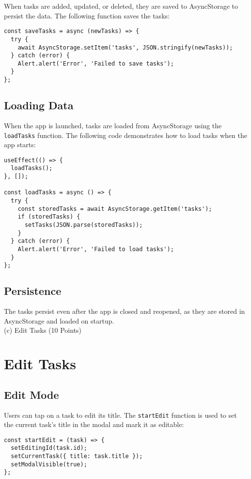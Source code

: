 \documentclass{article}
\begin{document}
When tasks are added, updated, or deleted, they are saved to AsyncStorage to persist the data. The following function saves the tasks:

\begin{verbatim}
const saveTasks = async (newTasks) => {
  try {
    await AsyncStorage.setItem('tasks', JSON.stringify(newTasks));
  } catch (error) {
    Alert.alert('Error', 'Failed to save tasks');
  }
};
\end{verbatim}

\subsection*{Loading Data}

When the app is launched, tasks are loaded from AsyncStorage using the \texttt{loadTasks} function. The following code demonstrates how to load tasks when the app starts:

\begin{verbatim}
useEffect(() => {
  loadTasks();
}, []);

const loadTasks = async () => {
  try {
    const storedTasks = await AsyncStorage.getItem('tasks');
    if (storedTasks) {
      setTasks(JSON.parse(storedTasks));
    }
  } catch (error) {
    Alert.alert('Error', 'Failed to load tasks');
  }
};
\end{verbatim}

\subsection*{Persistence}

The tasks persist even after the app is closed and reopened, as they are stored in AsyncStorage and loaded on startup.\\

\vspace{1cm}
(c) Edit Tasks (10 Points)
\section*{Edit Tasks}

\subsection*{Edit Mode}

Users can tap on a task to edit its title. The \texttt{startEdit} function is used to set the current task's title in the modal and mark it as editable:

\begin{verbatim}
const startEdit = (task) => {
  setEditingId(task.id);
  setCurrentTask({ title: task.title });
  setModalVisible(true);
};
\end{verbatim}
\end{document}

